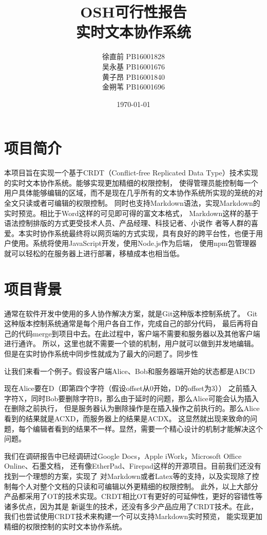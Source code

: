 \documentclass[11pt]{ctexart}
\title{OSH可行性报告\\[2ex]实时文本协作系统}
\author{徐直前 PB16001828\\吴永基 PB16001676\\黄子昂 PB16001840\\金朔苇 PB16001696\\}
\date{\today}
\begin{document}
\maketitle
\tableofcontents

\section{项目简介}
本项目旨在实现一个基于CRDT（Conflict-free Replicated Data Type）技术实现的实时文本协作系统。能够实现更加精细的权限控制，
使得管理员能控制每一个用户具体能够编辑的区域，而不是现在几乎所有的文本协作系统所实现的笼统的对全文只读或者可编辑的权限控制。
同时也支持Markdown语法，实现Markdown的实时预览。相比于Word这样的可见即可得的富文本格式，
Markdown这样的基于语法控制排版的方式更受技术人员、产品经理、科技记者、小说作
者等人群的喜爱。本实时协作系统最终将以网页端的方式实现，具有良好的跨平台性，也便于用户使用。系统将使用JavaScript开发，使用Node.js作为后端，
使用npm包管理器就可以轻松的在服务器上进行部署，移植成本也相当低。
\section{项目背景}
通常在软件开发中使用的多人协作解决方案，就是Git这种版本控制系统了。
Git这种版本控制系统通常是每个用户各自工作，完成自己的部分代码，
最后再将自己的代码merge到项目中去。在此过程中，客户端不需要和服务器以及其他客户端进行通许。
所以，这里也就不需要一个锁的机制，用户就可以做到并发地编辑。
但是在实时协作系统中同步性就成为了最大的问题了。同步性

让我们来看一个例子。假设客户端Alice、Bob和服务器端开始的状态都是ABCD

现在Alice要在D（即第四个字符（假设offset从0开始，D的offset为3））
之前插入字符X，同时Bob要删除字符B，那么由于延时的问题，那么Alice可能会认为插入在删除之前执行，
但是服务器认为删除操作是在插入操作之前执行的。那么Alice看到的结果就是ACXD，而服务器上的结果是ACDX。
这显然就出现来致命的问题，每个编辑者看到的结果不一样。显然，需要一个精心设计的机制才能解决这个问题。

我们在调研报告中已经调研过Google Docs，Apple iWork，Microsoft Office Online、石墨文档，
还有像EtherPad、Firepad这样的开源项目。目前我们还没有找到一个理想的方案，实现了
对Markdown或者Latex等的支持，以及实现除了控制每个人对整个文档的只读和可编辑以外更精细的权限控制。
此外，以上大部分产品都采用了OT的技术实现。CRDT相比OT有更好的可延伸性，更好的容错性等诸多优点，因为其是
新诞生的技术，还没有多少产品应用了CRDT技术。在此，我们也尝试使用CRDT技术来构建一个可以支持Markdown实时预览，
能实现更加精细的权限控制的实时文本协作系统。
\end{document}
